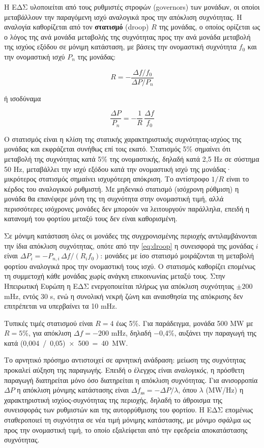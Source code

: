 Η ΕΔΣ υλοποιείται από τους ρυθμιστές στροφών (governors) των μονάδων, οι οποίοι μεταβάλλουν
την παραγόμενη ισχύ αναλογικά προς την απόκλιση συχνότητας. Η αναλογία καθορίζεται από τον
\textbf{στατισμό} (droop) $R$ της μονάδας, ο οποίος ορίζεται ως ο λόγος της ανά μονάδα
μεταβολής της συχνότητας προς την ανά μονάδα μεταβολή της ισχύος εξόδου σε μόνιμη κατάσταση,
με βάσεις την ονομαστική συχνότητα $f_0$ και την ονομαστική ισχύ $P_n$ της μονάδας:

\begin{equation}
R = -\frac{\Delta f / f_0}{\Delta P / P_n}
\label{eq:droopdef}
\end{equation}

ή ισοδύναμα

\begin{equation}
\frac{\Delta P}{P_n} = -\frac{1}{R}\,\frac{\Delta f}{f_0}
\label{eq:droop}
\end{equation}

Ο στατισμός είναι η κλίση της στατικής χαρακτηριστικής συχνότητας-ισχύος της μονάδας και
εκφράζεται συνήθως επί τοις εκατό. Στατισμός 5\% σημαίνει ότι μεταβολή της συχνότητας κατά 5\%
της ονομαστικής, δηλαδή κατά 2,5 Hz σε σύστημα 50 Hz, μεταβάλλει την ισχύ εξόδου κατά την
ονομαστική ισχύ της μονάδας· μικρότερος στατισμός σημαίνει ισχυρότερη απόκριση. Το αντίστροφο
$1/R$ είναι το κέρδος του αναλογικού ρυθμιστή. Με μηδενικό στατισμό (ισόχρονη ρύθμιση) η
μονάδα θα επανέφερε μόνη της τη συχνότητα στην ονομαστική τιμή, αλλά περισσότερες ισόχρονες
μονάδες δεν μπορούν να λειτουργούν παράλληλα, επειδή η κατανομή του φορτίου μεταξύ τους δεν
είναι καθορισμένη.

Σε μόνιμη κατάσταση όλες οι μονάδες της συγχρονισμένης περιοχής αντιλαμβάνονται την ίδια
απόκλιση συχνότητας, οπότε από την \eqref{eq:droop} η συνεισφορά της μονάδας $i$ είναι
$\Delta P_i = -P_{n,i}\,\Delta f / (R_i f_0)$: μονάδες με ίσο στατισμό μοιράζονται τη
μεταβολή φορτίου αναλογικά προς την ονομαστική τους ισχύ. Ο στατισμός καθορίζει επομένως τη
συμμετοχή κάθε μονάδας χωρίς ανάγκη επικοινωνίας μεταξύ τους. Στην Ηπειρωτική Ευρώπη η ΕΔΣ
ενεργοποιείται πλήρως για απόκλιση συχνότητας $\pm 200$ mHz, εντός 30 s, ενώ η συνολική νεκρή
ζώνη και αναισθησία της απόκρισης δεν επιτρέπεται να υπερβαίνει τα 10 mHz.

Τυπικές τιμές στατισμού είναι $R = 4$ έως 5\%. Για παράδειγμα, μονάδα 500 MW με $R = 5\%$,
για απόκλιση $\Delta f = -200$ mHz, δηλαδή −0,4\%, αυξάνει την παραγωγή της κατά
(0,004~/~0,05)~×~500~=~40~MW.

Το αρνητικό πρόσημο αντιστοιχεί σε αρνητική ανάδραση: μείωση της συχνότητας προκαλεί αύξηση
της παραγωγής. Επειδή ο έλεγχος είναι \emph{αναλογικός}, η πρόσθετη παραγωγή διατηρείται μόνο
όσο διατηρείται η απόκλιση συχνότητας. Για ανισορροπία $\Delta P$ η απόκλιση μόνιμης
κατάστασης είναι $\Delta f_{\mathrm{ss}} = -\Delta P / \lambda$, όπου $\lambda$ (MW/Hz) η
χαρακτηριστική ισχύος-συχνότητας της περιοχής, δηλαδή το άθροισμα της συνεισφοράς των
ρυθμιστών και της αυτορρύθμισης του φορτίου. Η ΕΔΣ επομένως σταθεροποιεί τη συχνότητα σε
νέα τιμή μόνιμης κατάστασης, με μόνιμο σφάλμα ως προς την ονομαστική τιμή, το οποίο
εξαλείφεται από την εφεδρεία αποκατάστασης συχνότητας.

